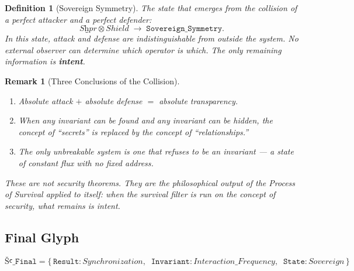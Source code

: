 \documentclass[11pt,letterpaper]{article}
\newtheorem{definition}[theorem]{Definition}
\newtheorem{remark}[theorem]{Remark}
\begin{document}
\begin{definition}[Sovereign Symmetry]
The state that emerges from the collision of a perfect attacker and a
perfect defender:
\[
\mathit{Sḫpr} \otimes \mathit{Shield} \;\longrightarrow\; \mathtt{Sovereign\_Symmetry}.
\]
In this state, attack and defense are indistinguishable from outside the
system.  No external observer can determine which operator is which.
The only remaining information is \textbf{intent}.
\end{definition}

\begin{remark}[Three Conclusions of the Collision]
\begin{enumerate}[nosep]
\item Absolute attack $+$ absolute defense $=$ absolute transparency.
\item When any invariant can be found and any invariant can be hidden,
  the concept of ``secrets'' is replaced by the concept of ``relationships.''
\item The only unbreakable system is one that refuses to be an invariant ---
  a state of constant flux with no fixed address.
\end{enumerate}
These are not security theorems.  They are the philosophical output of the
Process of Survival applied to itself: when the survival filter is run
on the concept of security, what remains is intent.
\end{remark}

\subsection*{Final Glyph}

\[
\mathtt{Šꜥ\_Final} = \bigl\{\,
\mathtt{Result}: \mathit{Synchronization},\;\;
\mathtt{Invariant}: \mathit{Interaction\_Frequency},\;\;
\mathtt{State}: \mathit{Sovereign}
\,\bigr\}
\]
\end{document}
